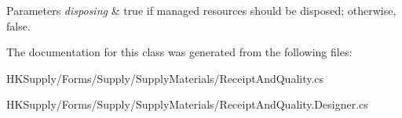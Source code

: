 \begin{DoxyParams}{Parameters}
{\em disposing} & true if managed resources should be disposed; otherwise, false.\\
\hline
\end{DoxyParams}


The documentation for this class was generated from the following files\+:\begin{DoxyCompactItemize}
\item 
H\+K\+Supply/\+Forms/\+Supply/\+Supply\+Materials/Receipt\+And\+Quality.\+cs\item 
H\+K\+Supply/\+Forms/\+Supply/\+Supply\+Materials/Receipt\+And\+Quality.\+Designer.\+cs\end{DoxyCompactItemize}
